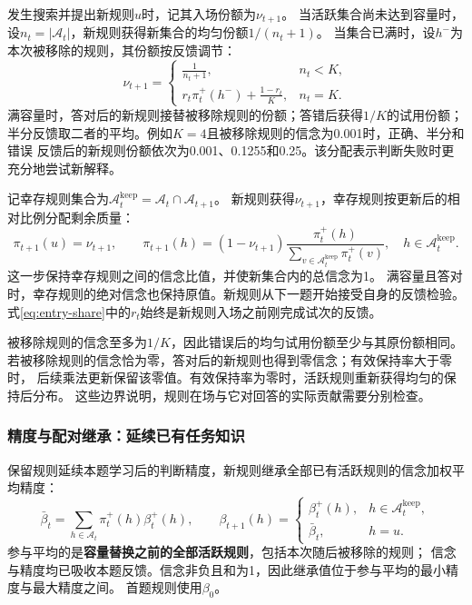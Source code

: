 \documentclass[11pt,a4paper]{article}
\numberwithin{equation}{section}
\newcommand{\A}{\mathcal{A}}
\begin{document}
发生搜索并提出新规则$u$时，记其入场份额为$\nu_{t+1}$。
当活跃集合尚未达到容量时，设$n_t=|\A_t|$，新规则获得新集合的均匀份额$1/(n_t+1)$。
当集合已满时，设$h^-$为本次被移除的规则，其份额按反馈调节：
\begin{equation}
\nu_{t+1}=\begin{cases}
\displaystyle\frac{1}{n_t+1},&n_t<K,\\[0.5em]
\displaystyle r_t\pi_t^+(h^-)+\frac{1-r_t}{K},&n_t=K.
\end{cases}
\label{eq:entry-share}
\end{equation}
满容量时，答对后的新规则接替被移除规则的份额；答错后获得$1/K$的试用份额；
半分反馈取二者的平均。例如$K=4$且被移除规则的信念为0.001时，正确、半分和错误
反馈后的新规则份额依次为0.001、0.1255和0.25。该分配表示判断失败时更充分地尝试新解释。

记幸存规则集合为$\A_t^{\mathrm{keep}}=\A_t\cap\A_{t+1}$。
新规则获得$\nu_{t+1}$，幸存规则按更新后的相对比例分配剩余质量：
\begin{equation}
\pi_{t+1}(u)=\nu_{t+1},\qquad
\pi_{t+1}(h)=(1-\nu_{t+1})
\frac{\pi_t^+(h)}{\sum_{v\in\A_t^{\mathrm{keep}}}\pi_t^+(v)},
\quad h\in\A_t^{\mathrm{keep}}.
\label{eq:entry-belief}
\end{equation}
这一步保持幸存规则之间的信念比值，并使新集合内的总信念为1。
满容量且答对时，幸存规则的绝对信念也保持原值。新规则从下一题开始接受自身的反馈检验。
式\eqref{eq:entry-share}中的$r_t$始终是新规则入场之前刚完成试次的反馈。

被移除规则的信念至多为$1/K$，因此错误后的均匀试用份额至少与其原份额相同。
若被移除规则的信念恰为零，答对后的新规则也得到零信念；有效保持率大于零时，
后续乘法更新保留该零值。有效保持率为零时，活跃规则重新获得均匀的保持后分布。
这些边界说明，规则在场与它对回答的实际贡献需要分别检查。

\subsubsection{精度与配对继承：延续已有任务知识}
\label{sec:transfer}
保留规则延续本题学习后的判断精度，新规则继承全部已有活跃规则的信念加权平均精度：
\begin{equation}
\bar\beta_t=\sum_{h\in\A_t}\pi_t^+(h)\beta_t^+(h),\qquad
\beta_{t+1}(h)=\begin{cases}\beta_t^+(h),&h\in\A_t^{\mathrm{keep}},\\
\bar\beta_t,&h=u.\end{cases}
\label{eq:transfer}
\end{equation}
参与平均的是\textbf{容量替换之前的全部活跃规则}，包括本次随后被移除的规则；
信念与精度均已吸收本题反馈。信念非负且和为1，因此继承值位于参与平均的最小精度与最大精度之间。
首题规则使用$\beta_0$。
\end{document}
